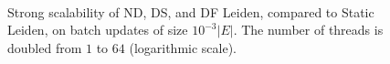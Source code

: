 \begin{figure}[hbtp]
  \centering
   \\[-4ex]
  \caption{Strong scalability of ND, DS, and DF Leiden, compared to Static Leiden, on batch updates of size $10^{-3} |E|$. The number of threads is doubled from $1$ to $64$ (logarithmic scale).}
  \label{fig:8020-scaling}
\end{figure}
